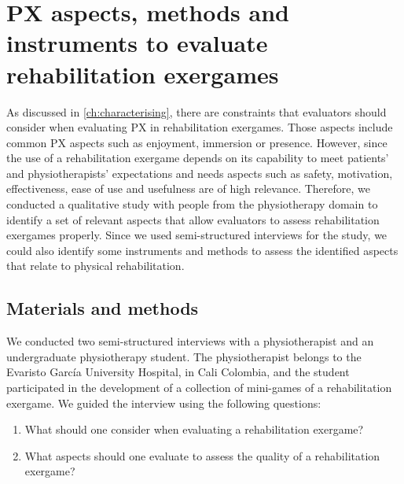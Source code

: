 \chapter{PX aspects, methods and instruments to evaluate rehabilitation exergames}
\label{ch:aspects}

As discussed in \autoref{ch:characterising}, there are constraints that evaluators should consider when evaluating \ac{PX} in rehabilitation exergames. Those aspects include common \ac{PX} aspects such as enjoyment, immersion or presence. However, since the use of a rehabilitation exergame depends on its capability to meet patients' and physiotherapists' expectations and needs aspects such as safety, motivation, effectiveness, ease of use and usefulness are of high relevance. Therefore, we conducted a qualitative study with people from the physiotherapy domain to identify a set of relevant aspects that allow evaluators to assess rehabilitation exergames properly. Since we used semi-structured interviews for the study, we could also identify some instruments and methods to assess the identified aspects that relate to physical rehabilitation.


\section{Materials and methods} %
\label{sec:mats_mets_aspects}
We conducted two semi-structured interviews with a physiotherapist and an undergraduate physiotherapy student. The physiotherapist belongs to the Evaristo Garc\'ia University Hospital, in Cali Colombia, and the student participated in the development of a collection of mini-games of a rehabilitation exergame. We guided the interview using the following questions:

\begin{enumerate}
    \item What should one consider when evaluating a rehabilitation exergame?
    \item What aspects should one evaluate to assess the quality of a rehabilitation exergame?
\end{enumerate}

